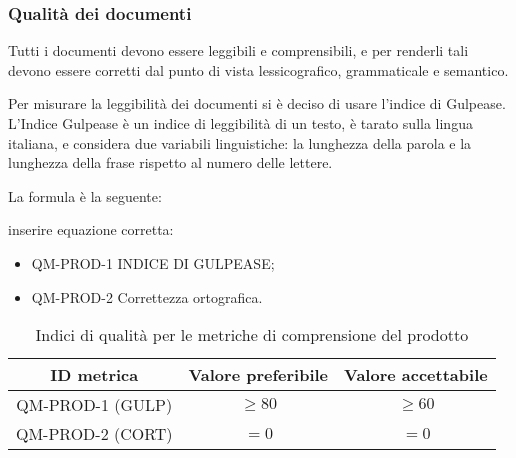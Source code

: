 \documentclass[../piano_di_qualifica.tex]{subfiles}
\begin{document}
\subsubsection{Qualità dei documenti}

Tutti i documenti devono essere leggibili e comprensibili, e per renderli tali devono essere corretti dal punto di vista lessicografico, grammaticale e semantico.\par
Per misurare la leggibilità dei documenti si è deciso di usare l’indice di Gulpease. L'Indice Gulpease è un indice di leggibilità di un testo, è tarato sulla lingua italiana, e considera due variabili linguistiche: la lunghezza della parola e la lunghezza della frase rispetto al numero delle lettere.\par
La formula è la seguente:\par
inserire equazione corretta:\par


\begin{itemize}
\item QM-PROD-1 INDICE DI GULPEASE;
\item QM-PROD-2 Correttezza ortografica.
\end{itemize}


\begin{table}[!ht]
\centering
\begin{tabular}{|c|c|c|}
		\hline
		\rowcolor{lightgray}
		\textbf{ID metrica} & \textbf{Valore preferibile} & \textbf{Valore accettabile} \\
		\hline 
		QM-PROD-1 (GULP) & \(\ge 80\) & \(\ge 60\) \\
 		\hline
		QM-PROD-2 (CORT) & \(= 0\) & \(= 0\) \\
		\hline
\end{tabular}
\caption{Indici di qualità per le metriche di comprensione del prodotto}
\end{table}
\end{document}

